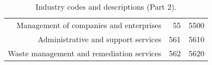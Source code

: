 \begin{landscape}
\begin{table}[h]
\begin{center}
\begin{tabular}{rrr}
Management of companies and enterprises                              & 55          & 5500      \\%
Administrative and support services                                  & 561         & 5610      \\%
Waste management and remediation services                            & 562         & 5620      \\%
\hline\hline
\end{tabular}
\end{center}
\caption{\label{tab:industries_2}Industry codes and descriptions (Part 2).}
\end{table}



\end{landscape}
